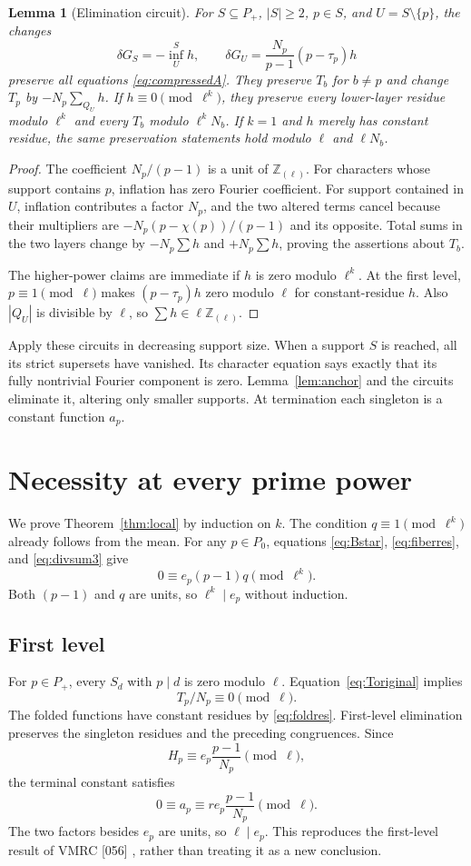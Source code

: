 \documentclass[11pt]{article}
\newtheorem{lemma}[theorem]{Lemma}
\newcommand{\Rl}{\mathbb Z_{(\ell)}}
\begin{document}
\begin{lemma}[Elimination circuit]\label{lem:circuit}
For $S\subseteq P_+$, $|S|\ge2$, $p\in S$, and $U=S\setminus\{p\}$, the changes
\[
 \delta G_S=-\operatorname{inf}_U^S h,
 \qquad \delta G_U=\frac{N_p}{p-1}(p-\tau_p)h
\]
preserve all equations \eqref{eq:compressedA}. They preserve $T_b$ for $b\ne p$ and change $T_p$ by $-N_p\sum_{Q_U}h$.
If $h\equiv0\pmod{\ell^k}$, they preserve every lower-layer residue modulo $\ell^k$ and every $T_b$ modulo $\ell^kN_b$. If $k=1$ and $h$ merely has constant residue, the same preservation statements hold modulo $\ell$ and $\ell N_b$.
\end{lemma}
\begin{proof}
The coefficient $N_p/(p-1)$ is a unit of $\Rl$. For characters whose support contains $p$, inflation has zero Fourier coefficient. For support contained in $U$, inflation contributes a factor $N_p$, and the two altered terms cancel because their multipliers are $-N_p(p-\chi(p))/(p-1)$ and its opposite. Total sums in the two layers change by $-N_p\sum h$ and $+N_p\sum h$, proving the assertions about $T_b$.

The higher-power claims are immediate if $h$ is zero modulo $\ell^k$. At the first level, $p\equiv1\pmod\ell$ makes $(p-\tau_p)h$ zero modulo $\ell$ for constant-residue $h$. Also $|Q_U|$ is divisible by $\ell$, so $\sum h\in\ell\Rl$.
\end{proof}

Apply these circuits in decreasing support size. When a support $S$ is reached, all its strict supersets have vanished. Its character equation says exactly that its fully nontrivial Fourier component is zero. Lemma~\ref{lem:anchor} and the circuits eliminate it, altering only smaller supports. At termination each singleton is a constant function $a_p$.

\section{Necessity at every prime power}
We prove Theorem~\ref{thm:local} by induction on $k$. The condition $q\equiv1\pmod{\ell^k}$ already follows from the mean. For any $p\in P_0$, equations \eqref{eq:Bstar}, \eqref{eq:fiberres}, and \eqref{eq:divsum3} give
\[
 0\equiv e_p(p-1)q\pmod{\ell^k}.
\]
Both $(p-1)$ and $q$ are units, so $\ell^k\mid e_p$ without induction.

\subsection{First level}
For $p\in P_+$, every $S_d$ with $p\mid d$ is zero modulo $\ell$. Equation~\eqref{eq:Toriginal} implies
\[
 T_p/N_p\equiv0\pmod\ell.
\]
The folded functions have constant residues by \eqref{eq:foldres}. First-level elimination preserves the singleton residues and the preceding congruences. Since
\[
 H_p\equiv e_p\frac{p-1}{N_p}\pmod\ell,
\]
the terminal constant satisfies
\[
 0\equiv a_p\equiv r e_p\frac{p-1}{N_p}\pmod\ell.
\]
The two factors besides $e_p$ are units, so $\ell\mid e_p$. This reproduces the first-level result of VMRC [056] \cite{VMRC}, rather than treating it as a new conclusion.
\end{document}
